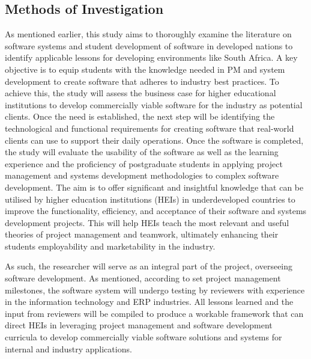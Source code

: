 \subsection{Methods of Investigation}
\par{As mentioned earlier, this study aims to thoroughly examine the literature on software systems and student development 
of software in developed nations to identify applicable lessons for developing environments like South Africa. A key 
objective is to equip students with the knowledge needed in PM and system development to create software that adheres to 
industry best practices. To achieve this, the study will assess the business case for higher educational institutions to 
develop commercially viable software for the industry as potential clients. Once
the need is established, the next step will be identifying the technological and functional requirements for 
creating software that real-world clients can use to support their daily operations. Once the software is completed, 
the study will evaluate the usability of the software as well as the learning experience and the proficiency of postgraduate 
students in applying project management and systems development methodologies to complex software development. The 
aim is to offer significant and insightful knowledge that can be utilised by higher education institutions (HEIs) in 
underdeveloped countries to improve the functionality, efficiency, and acceptance of their software and systems 
development projects. This will help HEIs teach the most relevant and useful theories of project management and teamwork, 
ultimately enhancing their students employability and marketability in the industry.}
\par{As such, the researcher will serve as an integral part of the project, overseeing software development. As 
mentioned, according to set project management milestones, the software system will undergo testing by reviewers with 
experience in the information technology and ERP industries. All lessons learned and the input from reviewers will be 
compiled to produce a workable framework that can direct HEIs in leveraging project management and software development 
curricula to develop commercially viable software solutions and systems for internal and industry applications.}

